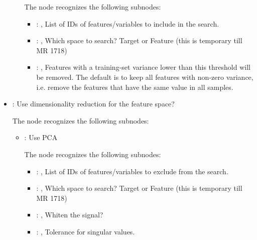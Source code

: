 \begin{itemize}
\begin{itemize}
          The  node recognizes the following subnodes:
          \begin{itemize}
            \item {}: , 
              List of IDs of features/variables to include in the search.

            \item {}: , 
              Which space to search? Target or Feature (this is temporary till MR 1718)

            \item {}: , 
              Features with a training-set variance lower than this threshold                   will
              be removed. The default is to keep all features with non-zero
              variance, i.e. remove the features that have the same value in all
              samples.
          \end{itemize}
      \end{itemize}

    \item {}:
      Use dimensionality reduction for the feature space?

      The  node recognizes the following subnodes:
      \begin{itemize}
        \item {}:
          Use PCA

          The  node recognizes the following subnodes:
          \begin{itemize}
            \item {}: , 
              List of IDs of features/variables to exclude from the search.

            \item {}: , 
              Which space to search? Target or Feature (this is temporary till MR 1718)

            \item {}: , 
              Whiten the signal?

            \item {}: , 
              Tolerance for singular values.
          \end{itemize}
      \end{itemize}


\end{itemize}
